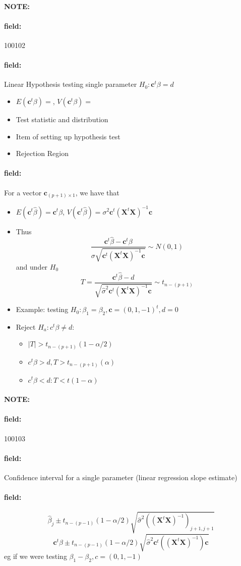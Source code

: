 \documentclass[12pt]{article}
\newenvironment{note}{\paragraph{NOTE:}}{}
\newenvironment{field}{\paragraph{field:}}{}
\begin{document}
\begin{note} \begin{field} \tiny 100102 \end{field}
 \begin{field}
  Linear Hypothesis testing single parameter $H_0: \mathbf{c}^t \beta = d$
  \begin{itemize}
   \item $E(\mathbf{c}^t \beta) = $, $V(\mathbf{c}^t \beta)= $
   \item Test statistic and distribution
   \item Item of setting up hypothesis test
   \item Rejection Region
  \end{itemize}
 \end{field}
 \begin{field}
  For a vector $\mathbf{c}_{(p+1)\times 1}$, we have that
  \begin{itemize}
   \item $E(\textbf{c}^t\hat{\beta}) = \mathbf{c}^t \beta$, $V(\mathbf{c}^t \hat{\beta}) = \sigma^2 \mathbf{c}^t (\mathbf{X}^t \mathbf{X})^{-1} \mathbf{c}$
   \item Thus $$ \frac{\mathbf{c}^t \hat{\beta} - \mathbf{c}^t \beta }{\sigma \sqrt{\mathbf{c}^t(\mathbf{X}^t \mathbf{X})^{-1} \mathbf{c}}} \sim N(0,1)$$ and under $H_0$
         $$ T = \frac{\mathbf{c}^t \hat{\beta} - d}{ \sqrt{\hat{\sigma}^2\mathbf{c}^t(\mathbf{X}^t \mathbf{X})^{-1} \mathbf{c}}} \sim t_{n - (p+1)}$$
   \item Example: testing $H_0: \beta_1 = \beta_2, \mathbf{c} = (0,1,-1)^t, d = 0$
   \item Reject $H_a: c^t \beta \neq d: $
\begin{itemize}
  \item $  |T| > t_{n - (p+1)}(1-\alpha/2)$
  \item $c^t \beta > d, T > t_{n-(p+1)}(\alpha)$
  \item $c^t\beta < d: T < t(1 - \alpha)$
\end{itemize}
  \end{itemize}
 \end{field}
\end{note}


\begin{note} \begin{field} \tiny 100103 \end{field}
 \begin{field}
  Confidence interval for a single parameter (linear regression slope estimate)
 \end{field}
 \begin{field}
  $$ \hat{\beta}_j \pm t_{n-(p-1)}(1 - \alpha/2)\sqrt{\hat{\sigma}^2((\mathbf{X}^t \mathbf{X})^{-1})_{j+1,j+1}} $$
  $$ \mathbf{c}^t \beta \pm t_{n-(p-1)}(1 - \alpha/2)\sqrt{\hat{\sigma}^2 \mathbf{c}^t((\mathbf{X}^t \mathbf{X})^{-1})\mathbf{c}}  $$
  eg if we were testing $\beta_1 - \beta_2, c = (0,1,-1)$
 \end{field}
\end{note}
\end{document}
